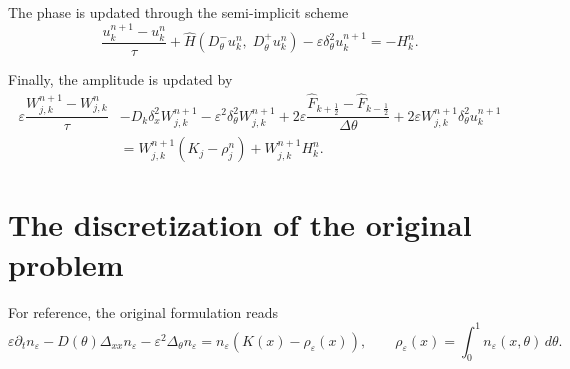 \documentclass[11pt, dina4, amsfont12]{article}
\begin{document}
The phase is updated through the semi-implicit scheme
\[
\dfrac{u_k^{n+1} - u_k^n}{\tau}
+\widehat{H} \!\left(D_\theta^- u_k^n,\; D_\theta^+ u_k^n\right)
- \varepsilon \delta_\theta^2 u_k^{n+1}
= -H_k^n.
\]

Finally, the amplitude is updated by
\begin{equation*}
\begin{aligned}
\varepsilon \dfrac{W_{j,k}^{n+1}-W_{j,k}^n}{\tau}
&- D_k\delta_x^2W_{j,k}^{n+1}
- \varepsilon^2 \delta_\theta^2 W_{j,k}^{n+1}
+ 2\varepsilon \dfrac{\widehat{F}_{k+\frac{1}{2}} - \widehat{F}_{k-\frac{1}{2}}}{\Delta\theta}
+ 2\varepsilon W_{j,k}^{n+1}\delta_\theta^2u_k^{n+1} \\
&= W_{j,k}^{n+1}(K_j-\rho_j^n) + W_{j,k}^{n+1}H_k^n.
\end{aligned}
\end{equation*}

\section{The discretization of the original problem}

For reference, the original formulation reads
\[
\varepsilon \partial_t n_\varepsilon - D(\theta)\Delta_{xx}n_\varepsilon -\varepsilon^2\Delta_\theta n_\varepsilon = n_\varepsilon(K(x) - \rho_\varepsilon (x)),
\qquad
\rho_\varepsilon(x) = \int_0^1 n_\varepsilon(x,\theta) \, d\theta.
\]
\end{document}
